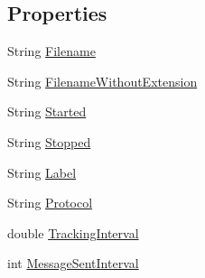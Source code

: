 \subsection*{Properties}
\begin{DoxyCompactItemize}
\item 
String \hyperlink{class_web_analyzer_1_1_models_1_1_data_model_1_1_test_model_a4353d075e751f00ca785cf5702f00910}{Filename}
\item 
String \hyperlink{class_web_analyzer_1_1_models_1_1_data_model_1_1_test_model_a91b896389e06b664e992c719f4d73e9b}{Filename\+Without\+Extension}
\item 
String \hyperlink{class_web_analyzer_1_1_models_1_1_data_model_1_1_test_model_acdb09845b9c3bc8582f78d2729524216}{Started}
\item 
String \hyperlink{class_web_analyzer_1_1_models_1_1_data_model_1_1_test_model_a636a8cedde376c835de9d909e8ec2c2d}{Stopped}
\item 
String \hyperlink{class_web_analyzer_1_1_models_1_1_data_model_1_1_test_model_a2ac39416a04e9771399c9003ca669848}{Label}
\item 
String \hyperlink{class_web_analyzer_1_1_models_1_1_data_model_1_1_test_model_a4811dcec47a39aca2cdb24447e7b232a}{Protocol}
\item 
double \hyperlink{class_web_analyzer_1_1_models_1_1_data_model_1_1_test_model_a8f50461cf57a8d7c48b795b28335fbd3}{Tracking\+Interval}
\item 
int \hyperlink{class_web_analyzer_1_1_models_1_1_data_model_1_1_test_model_afe3c73f555081b0e3aceb662c361fcab}{Message\+Sent\+Interval}
\end{DoxyCompactItemize}
